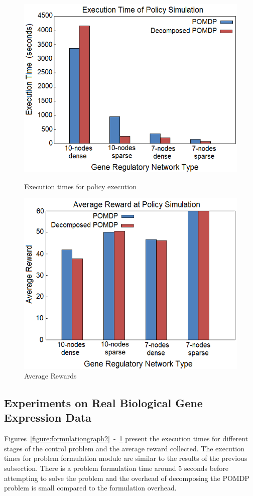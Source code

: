 \begin{figure}
\centering \includegraphics[scale=0.5]{experiments/graph11.png}
\caption{Execution times for policy execution}\label{figure:policyexecution2}
\centering \includegraphics[scale=0.5]{experiments/graph12.png}
\caption{Average Rewards}\label{figure:averagereward2}
\end{figure}
\subsection{Experiments on Real Biological Gene Expression Data}
Figures~\ref{figure:formulationgraph2}~-~\ref{figure:averagereward2} present the execution times for
different stages of the control problem and the average reward collected. The execution times for problem
formulation module are similar to the results of the previous subsection. There is a problem formulation time
around 5 seconds before attempting to solve the problem and the overhead of decomposing the POMDP problem is
small compared to the formulation overhead.


